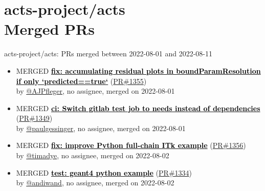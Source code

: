 \providecommand{\prmerged}{MERGED }
\providecommand{\propen}{OPEN }
\providecommand{\prwip}{WIP}
    










\section{ acts-project/acts \\ Merged PRs}
\begin{frame}[allowframebreaks]{ acts-project/acts: PRs merged 
between 2022-08-01 and 2022-08-11
}

  \begin{itemize}
    
    \item
    \prmerged\textbf{\href{https://github.com/acts-project/acts/pull/1355}{\textcolor{black}{fix: accumulating residual plots in boundParamResolution if only `predicted==true`}}}
    (\href{https://github.com/acts-project/acts/pull/1355}{PR\#1355}) \\
    by \href{https://github.com/AJPfleger}{@AJPfleger}, {}no assignee, merged on 2022-08-01

    \item
    \prmerged\textbf{\href{https://github.com/acts-project/acts/pull/1349}{\textcolor{black}{ci: Switch gitlab test job to needs instead of dependencies}}}
    (\href{https://github.com/acts-project/acts/pull/1349}{PR\#1349}) \\
    by \href{https://github.com/paulgessinger}{@paulgessinger}, {}no assignee, merged on 2022-08-01

    \item
    \prmerged\textbf{\href{https://github.com/acts-project/acts/pull/1356}{\textcolor{black}{fix: improve Python full-chain ITk example}}}
    (\href{https://github.com/acts-project/acts/pull/1356}{PR\#1356}) \\
    by \href{https://github.com/timadye}{@timadye}, {}no assignee, merged on 2022-08-02

    \item
    \prmerged\textbf{\href{https://github.com/acts-project/acts/pull/1334}{\textcolor{black}{test: geant4 python example}}}
    (\href{https://github.com/acts-project/acts/pull/1334}{PR\#1334}) \\
    by \href{https://github.com/andiwand}{@andiwand}, {}no assignee, merged on 2022-08-02


\end{itemize}
\end{frame}
